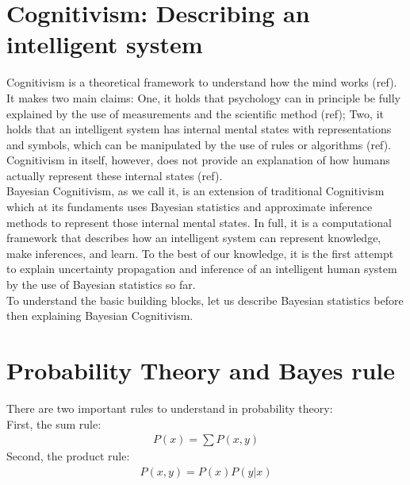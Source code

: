 \documentclass[oneside, 11pt]{book}
\begin{document}
\section{Cognitivism: Describing an intelligent system}
Cognitivism is a theoretical framework to understand how the mind works (ref). It makes two main claims: One, it holds that psychology can in principle be fully explained by the use of measurements and the scientific method (ref); Two, it holds that an intelligent system has internal mental states with representations and symbols, which can be manipulated by the use of rules or algorithms (ref). Cognitivism in itself, however, does not provide an explanation of how humans actually represent these internal states (ref). \\
Bayesian Cognitivism, as we call it, is an extension of traditional Cognitivism which at its fundaments uses Bayesian statistics and approximate inference methods to represent those internal mental states. In full, it is a computational framework that describes how an intelligent system can represent knowledge, make inferences, and learn.  To the best of our knowledge, it is the first attempt to explain uncertainty propagation and inference of an intelligent human system by the use of Bayesian statistics so far.\medskip\\
To understand the basic building blocks, let us describe Bayesian statistics before then explaining Bayesian Cognitivism.

\section{Probability Theory and Bayes rule}
There are two important rules to understand in probability theory:\\
First, the sum rule: 
\begin{align}
P(x) = \sum P(x,y)
\end{align}
Second, the product rule: 
\begin{align}
P(x,y) = P(x) P(y|x)
\end{align}
\end{document}
